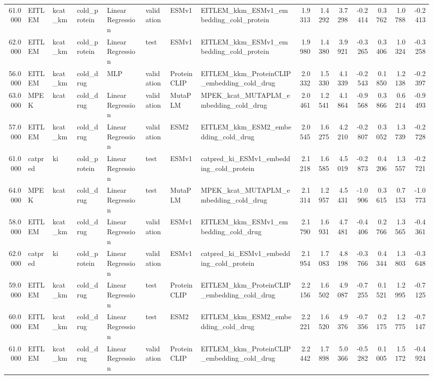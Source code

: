 \begin{tabular}{rlllllllrrrrrrr}
61.0000 & EITLEM & kcat_km & cold_protein & Linear Regression & validation & ESMv1 & EITLEM_kkm_ESMv1_embedding_cold_protein & 1.9313 & 1.4292 & 3.7298 & -0.2414 & 0.3762 & 1.0788 & -0.2413 \\
62.0000 & EITLEM & kcat_km & cold_protein & Linear Regression & test & ESMv1 & EITLEM_kkm_ESMv1_embedding_cold_protein & 1.9980 & 1.4380 & 3.9921 & -0.3265 & 0.3406 & 1.0324 & -0.3258 \\
56.0000 & EITLEM & kcat_km & cold_drug & MLP & validation & ProteinCLIP & EITLEM_kkm_ProteinCLIP_embedding_cold_drug & 2.0332 & 1.5330 & 4.1339 & -0.2543 & 0.1850 & 1.2138 & -0.2397 \\
63.0000 & MPEK & kcat & cold_drug & Linear Regression & validation & MutaPLM & MPEK_kcat_MUTAPLM_embedding_cold_drug & 2.0461 & 1.2541 & 4.1864 & -0.9568 & 0.3866 & 0.6214 & -0.9493 \\
57.0000 & EITLEM & kcat_km & cold_drug & Linear Regression & validation & ESM2 & EITLEM_kkm_ESM2_embedding_cold_drug & 2.0545 & 1.6275 & 4.2210 & -0.2807 & 0.3052 & 1.3739 & -0.2728 \\
61.0000 & catpred & ki & cold_protein & Linear Regression & test & ESMv1 & catpred_ki_ESMv1_embedding_cold_protein & 2.1218 & 1.6585 & 4.5019 & -0.2873 & 0.4206 & 1.3557 & -0.2721 \\
64.0000 & MPEK & kcat & cold_drug & Linear Regression & test & MutaPLM & MPEK_kcat_MUTAPLM_embedding_cold_drug & 2.1314 & 1.2957 & 4.5431 & -1.0906 & 0.3615 & 0.7153 & -1.0773 \\
58.0000 & EITLEM & kcat_km & cold_drug & Linear Regression & validation & ESMv1 & EITLEM_kkm_ESMv1_embedding_cold_drug & 2.1790 & 1.6931 & 4.7481 & -0.4406 & 0.2766 & 1.3565 & -0.4361 \\
62.0000 & catpred & ki & cold_protein & Linear Regression & validation & ESMv1 & catpred_ki_ESMv1_embedding_cold_protein & 2.1954 & 1.7083 & 4.8198 & -0.3766 & 0.4344 & 1.3803 & -0.3648 \\
59.0000 & EITLEM & kcat_km & cold_drug & Linear Regression & test & ProteinCLIP & EITLEM_kkm_ProteinCLIP_embedding_cold_drug & 2.2156 & 1.6502 & 4.9087 & -0.7255 & 0.1521 & 1.2995 & -0.7125 \\
60.0000 & EITLEM & kcat_km & cold_drug & Linear Regression & test & ESM2 & EITLEM_kkm_ESM2_embedding_cold_drug & 2.2221 & 1.6520 & 4.9376 & -0.7356 & 0.2175 & 1.2775 & -0.7147 \\
61.0000 & EITLEM & kcat_km & cold_drug & Linear Regression & validation & ProteinCLIP & EITLEM_kkm_ProteinCLIP_embedding_cold_drug & 2.2442 & 1.7898 & 5.0366 & -0.5282 & 0.1005 & 1.5172 & -0.4924 \\

\end{tabular}
